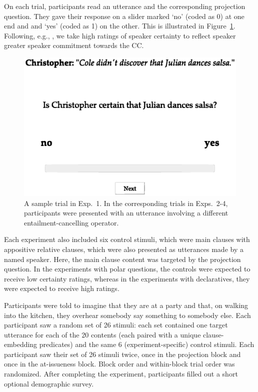 \documentclass[a4paper,12pt,twoside]{article}
\begin{document}
			On each trial, participants read an utterance and the corresponding projection question. They gave their response on a slider marked `no' (coded as 0) at one end and and `yes' (coded as 1) on the other. This is illustrated in Figure~\ref{fig:trial}. Following, e.g., \citet{tonhauser_how_2018}, we take high ratings of speaker certainty to reflect speaker greater speaker commitment towards the CC.

			\begin{figure}[ht]
				\centering
				\includegraphics[width = .7\linewidth]{task-1n-proj.eps}
				\caption{A sample trial in Exp.~1. In the corresponding trials in Exps.~2-4, participants were presented with an utterance involving a different entailment-cancelling operator.}
				\label{fig:trial}
			\end{figure}

			Each experiment also included six control stimuli, which were main clauses with appositive relative clauses, which were also presented as utterances made by a named speaker. Here, the main clause content was targeted by the projection question. In the experiments with polar questions, the controls were expected to receive low certainty ratings, whereas in the experiments with declaratives, they were expected to receive high ratings.

			Participants were told to imagine that they are at a party and that, on walking into the kitchen, they overhear somebody say something to somebody else. Each participant saw a random set of 26 stimuli: each set contained one target utterance for each of the 20 contents (each paired with a unique clause-embedding predicates) and the same 6 (experiment-specific) control stimuli. Each participant saw their set of 26 stimuli twice, once in the projection block and once in the at-issueness block. Block order and within-block trial order was randomized. After completing the experiment, participants filled out a short optional demographic survey.
\end{document}
